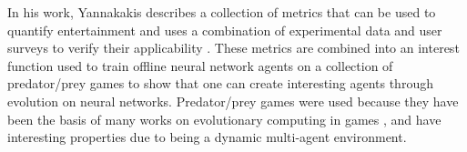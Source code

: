 In his work, Yannakakis describes a collection of metrics that can be used to
quantify entertainment \citep{yannakakis2005ai} and uses a combination
of experimental data and user surveys to verify their applicability
\citep{yannakakis2007modeling,yannakakis2008model}. These metrics are combined
into an interest function used to train offline neural network agents on a
collection of predator/prey games to show that one can create interesting agents
through evolution on neural networks. Predator/prey games were used because they
have been the basis of many works on evolutionary computing in games
\citep{koza1992genetic,lucas2005evolving,gallagher2003learning}, and have
interesting properties due to being a dynamic multi-agent environment.

